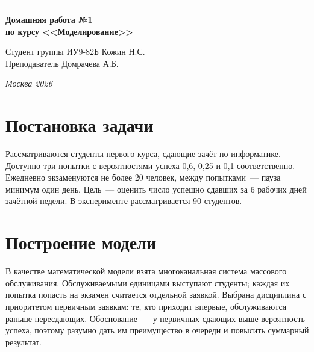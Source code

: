 \documentclass[a4paper, 14pt]{extarticle}
\begin{document}
\begin{titlepage}
\vspace*{-16pt}
\hspace{30pt}\rule{0.866\textwidth}{0.4pt}
  
\vspace{11em}

\begin{center}
\Large {\bf Домашняя работа №1} \\ 
\large {\bf по курсу <<Моделирование>>} \\
\end{center}\normalsize

\vspace{8em}


\begin{flushright}
  {Студент группы ИУ9-82Б Кожин Н.С. \hspace*{15pt}\\ 
  \vspace{2ex}
  Преподаватель Домрачева А.Б.\hspace*{15pt}}
\end{flushright}

\bigskip

\vfill
 

\begin{center}
\textsl{Москва 2026}
\end{center}
\end{titlepage}

\renewcommand{\ttdefault}{pcr}

\setlength{\tabcolsep}{3pt}
\newpage
\setcounter{page}{2}
\section{Постановка задачи}

Рассматриваются студенты первого курса, сдающие зачёт по информатике. Доступно три попытки с вероятностями успеха 0,6, 0,25 и 0,1 соответственно. Ежедневно экзаменуются не более 20 человек, между попытками~--- пауза минимум один день. Цель~--- оценить число успешно сдавших за 6 рабочих дней зачётной недели. В эксперименте рассматривается 90 студентов.

\section{Построение модели}

В качестве математической модели взята многоканальная система массового обслуживания. Обслуживаемыми единицами выступают студенты; каждая их попытка попасть на экзамен считается отдельной заявкой. Выбрана дисциплина с приоритетом первичным заявкам: те, кто приходит впервые, обслуживаются раньше пересдающих. Обоснование~--- у первичных сдающих выше вероятность успеха, поэтому разумно дать им преимущество в очереди и повысить суммарный результат.
\end{document}
